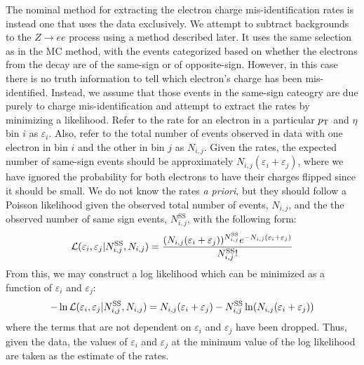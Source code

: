 The nominal method for extracting the electron charge mis-identification
rates is instead one that uses the data exclusively. 
We attempt to subtract backgrounds to the $Z\rightarrow ee$
process using a method described later.
It uses the same selection as in the MC method, with the events
categorized based on whether the electrons from the \z
decay are of the same-sign or of opposite-sign.
However, in this case
there is no truth information to tell which electron's charge
has been mis-identified. Instead, we assume that those events in
the same-sign cateogry are due purely to charge mis-identification
and attempt to extract the rates by minimizing a likelihood.
Refer to the rate for an electron in a 
particular $p_{\mathrm{T}}$ and $\eta$ bin $i$ as $\varepsilon_i$.
Also, refer to the total number of events observed in data with one electron
in bin $i$ and the other in bin $j$ as $N_{i,j}$.
Given the rates, the expected number of same-sign events
should be approximately $N_{i,j}(\varepsilon_i + \varepsilon_j)$,
where we have ignored the probability for both electrons to have their
charges flipped since it should be small. We do
not know the rates \emph{a priori}, but they should follow 
a Poisson likelihood given the observed total number of events,
$N_{i,j}$, and the the observed number of same sign events,
$N_{i,j}^{\textrm{SS}}$, with the following form:
\begin{equation}
\mathcal{L}( \varepsilon_i,\varepsilon_j | N_{i,j}^{\textrm{SS}},N_{i,j})
=
\frac{(N_{i,j}(\varepsilon_i+\varepsilon_j))^{N^{\textrm{SS}}_{i,j}} e^{-N_{i,j}(\varepsilon_i+\varepsilon_j)}}{N^{\textrm{SS}}_{i,j}!}
\end{equation}
From this, we may construct a log likelihood which can be minimized
as a function of $\varepsilon_i$ and $\varepsilon_j$:
\begin{equation}
-\ln \mathcal{L}( \varepsilon_i,\varepsilon_j | N_{i,j}^{\textrm{SS}},N_{i,j}) = 
N_{i,j}(\varepsilon_i+\varepsilon_j)
- N^{\textrm{SS}}_{i,j} \ln(N_{i,j}(\varepsilon_i+\varepsilon_j))
\end{equation}
where the terms that are not dependent on $\varepsilon_i$
and $\varepsilon_j$ have been dropped.
Thus, given the data, the values of $\varepsilon_i$ and $\varepsilon_j$
at the minimum value of the log likelihood are taken as the estimate
of the rates.

